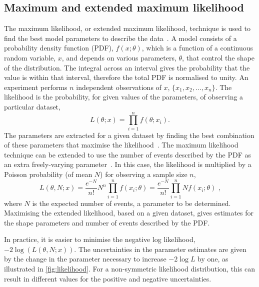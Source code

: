 \subsection{Maximum and extended maximum likelihood}
\label{sec:massfit:likelihood}

The maximum likelihood, or extended maximum likelihood, technique is used to find the best model parameters to describe the data~\cite{MLandEML,EML}. A model consists of a probability density function (PDF), $f(x;\theta)$, which is a function of a continuous random variable, $x$, and depends on various parameters, $\theta$, that control the shape of the distribution. The integral across an interval gives the probability that the value is within that interval, therefore the total PDF is normalised to unity. An experiment performs $n$ independent observations of $x$, $\{x_1, x_2, ..., x_n\}$. The likelihood is the probability, for given values of the parameters, of observing a particular dataset,
\begin{equation}
L(\theta;x) = \prod_{i=1}^{n} f(\theta;x_i).
\end{equation}
The parameters are extracted for a given dataset by finding the best combination of these parameters that maximise the likelihood~\cite{MLandEML}. The maximum likelihood technique can be extended to use the number of events described by the PDF as an extra freely-varying parameter~\cite{EML}. In this case, the likelihood is multiplied by a Poisson probability (of mean $N$) for observing a sample size $n$,
\begin{equation}
L(\theta, N;x) = \frac{e^{-N}}{n!}N^n \prod_{i=1}^{n} f(x_i;\theta) = \frac{e^{-N}}{n!} \prod_{i=1}^{n} N f(x_i;\theta) \text{ ,}
\end{equation}
where $N$ is the expected number of events, a parameter to be determined. Maximising the extended likelihood, based on a given dataset, gives estimates for the shape parameters and number of events described by the PDF.

In practice, it is easier to minimise the negative log likelihood, $-2\log(L(\theta, N;x))$. The uncertainties in the parameter estimates are given by the change in the parameter necessary to increase $-2\log L$ by one, as illustrated in \fig\ref{fig:likelihood}. For a non-symmetric likelihood distribution, this can result in different values for the positive and negative uncertainties. 

